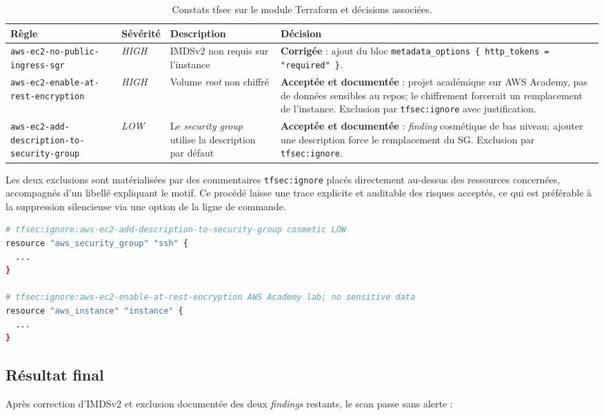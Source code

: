 \begin{table}[H]
\centering
\caption{Constats tfsec sur le module Terraform et décisions associées.}
\begin{tabular}{P{3.5cm} C{1.5cm} P{4.5cm} P{4cm}}
\toprule
\textbf{Règle} & \textbf{Sévérité} & \textbf{Description} & \textbf{Décision} \\
\midrule
\texttt{aws-ec2-no-public-ingress-sgr} & \textit{HIGH} & IMDSv2 non requis sur l'instance & \textbf{Corrigée} : ajout du bloc \texttt{metadata\_options \{ http\_tokens = "required" \}}. \\
\texttt{aws-ec2-enable-at-rest-encryption} & \textit{HIGH} & Volume \emph{root} non chiffré & \textbf{Acceptée et documentée} : projet académique sur AWS Academy, pas de données sensibles au repos; le chiffrement forcerait un remplacement de l'instance. Exclusion par \texttt{tfsec:ignore} avec justification. \\
\texttt{aws-ec2-add-description-to-security-group} & \textit{LOW} & Le \emph{security group} utilise la description par défaut & \textbf{Acceptée et documentée} : \emph{finding} cosmétique de bas niveau; ajouter une description force le remplacement du SG. Exclusion par \texttt{tfsec:ignore}. \\
\bottomrule
\end{tabular}
\end{table}

Les deux exclusions sont matérialisées par des commentaires
\texttt{tfsec:ignore} placés directement au-dessus des ressources
concernées, accompagnés d'un libellé expliquant le motif. Ce procédé
laisse une trace explicite et auditable des risques acceptés, ce qui
est préférable à la suppression silencieuse via une option de la
ligne de commande.

\begin{lstlisting}[language=bash, caption={Exclusions documentées dans \texttt{main.tf}.}]
# tfsec:ignore:aws-ec2-add-description-to-security-group cosmetic LOW
resource "aws_security_group" "ssh" {
  ...
}

# tfsec:ignore:aws-ec2-enable-at-rest-encryption AWS Academy lab; no sensitive data
resource "aws_instance" "instance" {
  ...
}
\end{lstlisting}

\subsection{Résultat final}

Après correction d'IMDSv2 et exclusion documentée des deux \emph{findings}
restants, le scan passe sans alerte :

